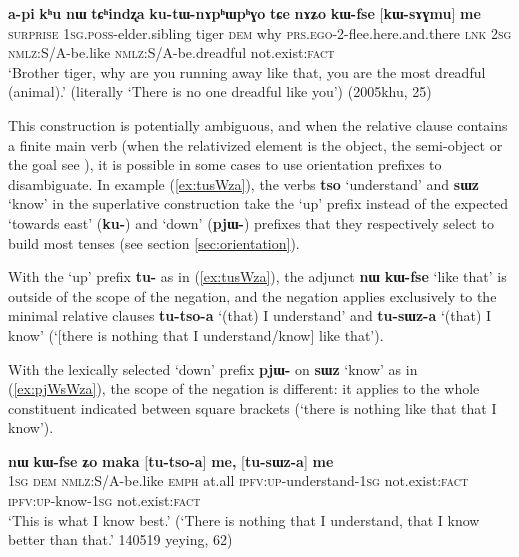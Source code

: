 \documentclass[oneside,a4paper,11pt]{article}
\newcommand{\ipa}[1]{{\phon\textbf{#1}}} %
\newcommand{\forme}[2]{\ipa{#1} `#2'}
\begin{document}
 \begin{exe}
\ex \label{ex:kWfse.me}
\gll \ipa{ama} 	\ipa{a-pi} 	\ipa{kʰu} 	\ipa{nɯ} 	\ipa{tɕʰindʐa} 	\ipa{ku-tɯ-nɤpʰɯpʰɣo} 	\ipa{tɕe}  \ipa{nɤʑo} 	\ipa{kɯ-fse} 	[\ipa{kɯ-sɤɣmu}] 	\ipa{me} 	\\
\textsc{surprise} \textsc{1sg.poss}-elder.sibling tiger \textsc{dem} why \textsc{prs.ego}-2-flee.here.and.there \textsc{lnk} \textsc{2sg}  \textsc{nmlz}:S/A-be.like   \textsc{nmlz}:S/A-be.dreadful  not.exist:\textsc{fact} \\
\glt `Brother tiger, why are you running away like that, you are the most dreadful (animal).' (literally `There is no one dreadful like you') (2005khu, 25)
\end{exe}

This construction is potentially ambiguous, and when the relative clause contains a finite main verb (when the relativized element is the object, the semi-object or the goal see \citealt{jacques16relatives}), it is possible in some cases to use orientation prefixes to disambiguate. In example (\ref{ex:tusWza}), the verbs \forme{tso}{understand} and \forme{sɯz}{know} in the superlative construction take the `up' prefix instead of the expected `towards east' (\ipa{ku-}) and `down' (\ipa{pjɯ-}) prefixes that they respectively select to build most tenses (see section \ref{sec:orientation}).

With the `up' prefix \ipa{tu-} as in (\ref{ex:tusWza}), the adjunct \ipa{nɯ} \ipa{kɯ-fse} `like that' is outside of the scope of the negation, and the negation applies exclusively to the minimal relative clauses \ipa{tu-tso-a} `(that) I understand' and \ipa{tu-sɯz-a} `(that) I know' (`[there is nothing that I understand/know] like that').

With the lexically selected `down' prefix \ipa{pjɯ-} on \forme{sɯz}{know} as in (\ref{ex:pjWsWza}), the scope of the negation is different: it applies to the whole constituent indicated between square brackets (`there is nothing like that that I know').
 
\begin{exe}
\ex \label{ex:tusWza}
\gll \ipa{aʑo} 	\ipa{nɯ} 	\ipa{kɯ-fse} 	\ipa{ʑo} 	\ipa{maka} [\ipa{tu-tso-a}] 	\ipa{me,} [\ipa{tu-sɯz-a}] 	\ipa{me} \\
\textsc{1sg} \textsc{dem} \textsc{nmlz}:S/A-be.like \textsc{emph} at.all \textsc{ipfv:up}-understand-\textsc{1sg} not.exist:\textsc{fact} \textsc{ipfv:up}-know-\textsc{1sg} not.exist:\textsc{fact} \\
\glt `This is what I know best.' (`There is nothing that I understand, that I know better than that.' 140519 yeying, 62)
\end{exe}
\end{document}
